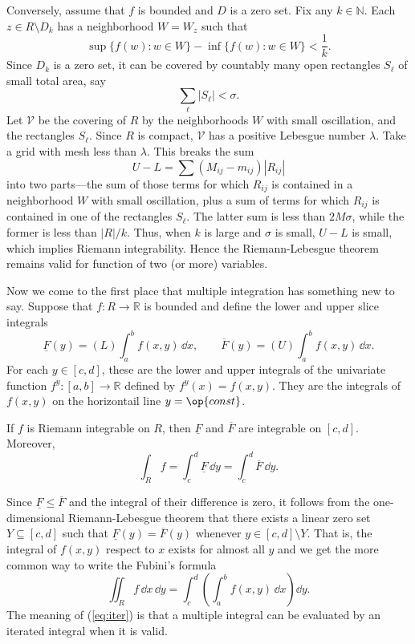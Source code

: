 \documentclass[11pt]{article}
\begin{document}
Conversely, assume that $f$ is bounded and $D$ is a zero set.  Fix any $k \in \mathbb{N}$.  Each $z \in R \setminus D_k$ has a neighborhood $W = W_z$ such that
\[
  \sup \{ f(w) \colon w \in W \} - \inf \{ f(w) \colon w \in W \} < \frac1k.
\]
Since $D_k$ is a zero set, it can be covered by countably many open rectangles $S_\ell$ of small total area, say
\[
  \sum_\ell |S_\ell| < \sigma.
\]
Let $\mathcal{V}$ be the covering of $R$ by the neighborhoods $W$ with small oscillation, and the rectangles $S_\ell$.  Since $R$ is compact, $\mathcal{V}$ has a positive Lebesgue number $\lambda$.  Take a grid with mesh less than $\lambda$.  This breaks the sum
\[
  U - L = \sum (M_{ij} - m_{ij}) |R_{ij}|
\]
into two parts---the sum of those terms for which $R_{ij}$ is contained in a neighborhood $W$ with small oscillation, plus a sum of terms for which $R_{ij}$ is contained in one of the rectangles $S_\ell$.  The latter sum is less than $2M \sigma$, while the former is less than $|R|/k$.  Thus, when $k$ is large and $\sigma$ is small, $U - L$ is small, which implies Riemann integrability.  Hence the Riemann-Lebesgue theorem remains valid for function of two (or more) variables.

Now we come to the first place that multiple integration has something new to say.  Suppose that $f : R \to \mathbb{R}$ is bounded and define the lower and upper \textsf{slice integrals}
\[
  \underline{F}(y) = (L) \int_a^b f(x,y) \, \dd x, \qquad
  \overline{F}(y) = (U) \int_a^b f(x,y) \, \dd x.
\]
For each $y \in [c,d]$, these are the lower and upper integrals of the univariate function $f^y : [a,b] \to \mathbb{R}$ defined by $f^y(x) = f(x,y)$.  They are the integrals of $f(x,y)$ on the horizontail line $y = \op{const}$.

\begin{thm}
  \label{thm:fubini}
  If $f$ is Riemann integrable on $R$, then $\underline{F}$ and $\overline{F}$ are integrable on $[c,d]$.  Moreover, 
  \[
    \int_R f = \int_c^d \underline{F} \, \dd y = \int_c^d \overline{F} \, \dd y.
  \]
\end{thm}

Since $\underline{F} \leqslant \overline{F}$ and the integral of their difference is zero, it follows from the one-dimensional Riemann-Lebesgue theorem that there exists a linear zero set $Y \subseteq [c,d]$ such that $\underline{F}(y) = \overline{F}(y)$ whenever $y \in [c,d] \setminus Y$.  That is, the integral of $f(x,y)$ respect to $x$ exists for almost all $y$ and we get the more common way to write the Fubini's formula
\begin{equation}
  \label{eq:iter}
  \iint_R f \, \dd x \, \dd y = \int_c^d \left( \int_a^b f(x,y) \, \dd x \right) \dd y.
\end{equation}
The meaning of (\ref{eq:iter}) is that a multiple integral can be evaluated by an \textsf{iterated integral} when it is valid.
\end{document}
